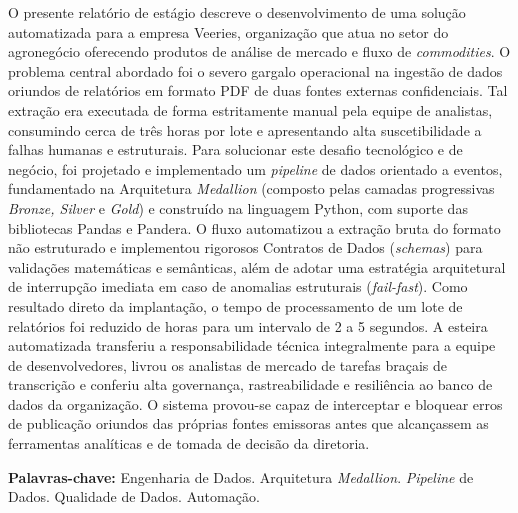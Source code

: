O presente relatório de estágio descreve o desenvolvimento de uma solução automatizada para a empresa Veeries, organização que atua no setor do agronegócio oferecendo produtos de análise de mercado e fluxo de \textit{commodities}. O problema central abordado foi o severo gargalo operacional na ingestão de dados oriundos de relatórios em formato PDF de duas fontes externas confidenciais. Tal extração era executada de forma estritamente manual pela equipe de analistas, consumindo cerca de três horas por lote e apresentando alta suscetibilidade a falhas humanas e estruturais. Para solucionar este desafio tecnológico e de negócio, foi projetado e implementado um \textit{pipeline} de dados orientado a eventos, fundamentado na Arquitetura \textit{Medallion} (composto pelas camadas progressivas \textit{Bronze, Silver} e \textit{Gold}) e construído na linguagem Python, com suporte das bibliotecas Pandas e Pandera. O fluxo automatizou a extração bruta do formato não estruturado e implementou rigorosos Contratos de Dados (\textit{schemas}) para validações matemáticas e semânticas, além de adotar uma estratégia arquitetural de interrupção imediata em caso de anomalias estruturais (\textit{fail-fast}). Como resultado direto da implantação, o tempo de processamento de um lote de relatórios foi reduzido de horas para um intervalo de 2 a 5 segundos. A esteira automatizada transferiu a responsabilidade técnica integralmente para a equipe de desenvolvedores, livrou os analistas de mercado de tarefas braçais de transcrição e conferiu alta governança, rastreabilidade e resiliência ao banco de dados da organização. O sistema provou-se capaz de interceptar e bloquear erros de publicação oriundos das próprias fontes emissoras antes que alcançassem as ferramentas analíticas e de tomada de decisão da diretoria.

\vspace{\onelineskip}
\noindent
\textbf{Palavras-chave:} Engenharia de Dados. Arquitetura \textit{Medallion}. \textit{Pipeline} de Dados. Qualidade de Dados. Automação.
